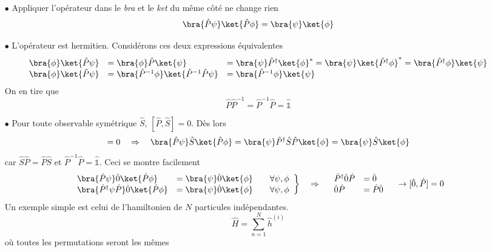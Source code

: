 \begin{itemize}
\item[$\bullet$] Appliquer l'opérateur dans le \textit{bra} et le \textit{ket} du même côté ne change rien
\begin{equation}
\bra{\hat{P}\psi}\ket{\hat{P}\phi} = \bra{\psi}\ket{\phi}
\end{equation}
\item[$\bullet$] L'opérateur est hermitien. Considérons ces deux expressions équivalentes
\begin{equation}
\begin{array}{lll}
\bra{\phi}\ket{\hat{P}\psi} &= \bra{\phi}\hat{P}\ket{\psi}  &= \bra{\psi}\hat{P}^\dagger\ket{\phi}^* = 
\bra{\psi}\ket{\hat{P}^\dagger\phi}^* = \bra{\hat{P}^\dagger \phi}\ket{\psi}\\
\bra{\phi}\ket{\hat{P}\psi} &= \bra{\hat{P}^{-1}\phi}\ket{\hat{P}^{-1}\hat{P}\psi} &= \bra{\hat{P}^{-1}\phi}\ket{\psi}
\end{array}
\end{equation}
On en tire que
\begin{equation}
\hat{P}\hat{P}^{-1} = \hat{P}^{-1}\hat{P} = \hat{\mathbb{1}}
\end{equation}
\item[$\bullet$] Pour toute observable symétrique $\hat{S}$, $[\hat{P},\hat{S}]=0$. Dès lors
\begin{equation}
[\hat{P},\hat{S}] = 0\quad\Rightarrow\quad \bra{\hat{P}\psi}\hat{S}\ket{\hat{P}\phi} = 
\bra{\psi}\hat{P}^\dagger\hat{S}\hat{P}\ket{\phi} = \bra{\psi}\hat{S}\ket{\phi}
\end{equation}
car $\hat{S}\hat{P}=\hat{P}\hat{S}$ et $\hat{P}^{-1}\hat{P} = \hat{\mathbb{1}}$. Ceci se montre facilement
\begin{equation}
\left.\begin{array}{lll}
\bra{\hat{P}\psi}\hat{0}\ket{\hat{P}\phi} &= \bra{\psi}\hat{0}\ket{\phi}&\quad \forall\psi,\phi\\
\bra{\hat{P}^\dagger\psi\hat{P}}\hat{0}\ket{\hat{P}\phi} &= \bra{\psi}\hat{0}\ket{\phi}&\quad \forall\psi,\phi
\end{array}\right\}\quad\Rightarrow\quad \begin{array}{ll}
\hat{P}^\dagger\hat{0}\hat{P} &= \hat{0}\\
\hat{0}\hat{P} &= \hat{P}\hat{0}
\end{array}\quad\rightarrow[\hat{0},\hat{P}] = 0
\end{equation}
Un exemple simple est celui de l'hamiltonien de $N$ particules indépendantes. 
\begin{equation}
\hat{H} = \sum_{n=1}^N \hat{h}^{(i)}
\end{equation}
où toutes les permutations seront les mêmes
\end{itemize}

